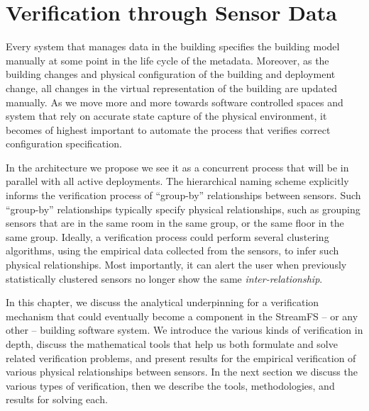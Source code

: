 \section{Verification through Sensor Data}


Every system that manages data in the building specifies the building model manually at some point in the life cycle of
the metadata.  Moreover, as the building changes and physical configuration of the building and deployment change,
all changes in the virtual representation of the building are updated manually.  As we move more and more towards
software controlled spaces and system that rely on accurate state capture of the physical environment, it becomes 
of highest important to automate the process that verifies correct configuration specification.

In the architecture we propose we see it as a concurrent process that will be in parallel with all active deployments.
The hierarchical naming scheme explicitly informs the verification process of ``group-by'' relationships between sensors.
Such ``group-by'' relationships typically specify physical relationships, such as grouping sensors that are in the same 
room in the same group, or the same floor in the same group.  Ideally, a verification process could perform several clustering
algorithms, using the empirical data collected from the sensors, to infer such physical relationships.  Most importantly,
it can alert the user when previously statistically clustered sensors no longer show the same \emph{inter-relationship}.

In this chapter, we discuss the analytical underpinning for a verification mechanism that could eventually become a 
component in the StreamFS -- or any other -- building software system.  We introduce the various kinds of verification in depth,
discuss the mathematical tools that help us both formulate and solve related verification problems, and present
results for the empirical verification of various physical relationships between sensors.  In the next section we discuss the various
types of verification, then we describe the tools, methodologies, and results for solving each.



